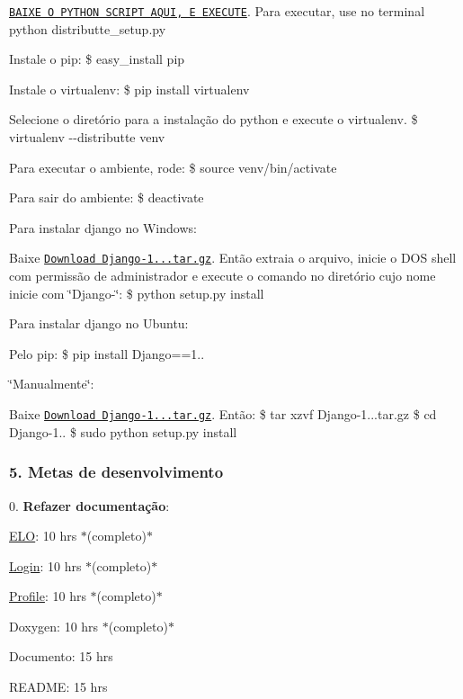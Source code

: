 \href{http://python-distribute.org/distribute_setup.py}{\tt B\-A\-I\-X\-E O P\-Y\-T\-H\-O\-N S\-C\-R\-I\-P\-T A\-Q\-U\-I, E E\-X\-E\-C\-U\-T\-E}. Para executar, use no terminal {\ttfamily python distributte\-\_\-setup.\-py}
\begin{DoxyItemize}
\item Instale o pip\-: {\ttfamily \$ easy\-\_\-install pip}
\item Instale o virtualenv\-: {\ttfamily \$ pip install virtualenv}
\item Selecione o diretório para a instalação do python e execute o virtualenv. {\ttfamily \$ virtualenv -\/-\/distributte venv}
\item Para executar o ambiente, rode\-: {\ttfamily \$ source venv/bin/activate}
\item Para sair do ambiente\-: {\ttfamily \$ deactivate}
\end{DoxyItemize}

Para instalar django no Windows\-:
\begin{DoxyItemize}
\item Baixe \href{https://www.djangoproject.com/download/1.6.2/tarball/}{\tt Download Django-\/1...\-tar.\-gz}. Então extraia o arquivo, inicie o D\-O\-S shell com permissão de administrador e execute o comando no diretório cujo nome inicie com \char`\"{}\-Django-\/\char`\"{}\-: {\ttfamily \$ python setup.\-py install}
\end{DoxyItemize}

Para instalar django no Ubuntu\-:
\begin{DoxyItemize}
\item Pelo pip\-: {\ttfamily \$ pip install Django==1..}
\item \char`\"{}\-Manualmente\char`\"{}\-:
\begin{DoxyItemize}
\item Baixe \href{https://www.djangoproject.com/download/1.6.2/tarball/}{\tt Download Django-\/1...\-tar.\-gz}. Então\-: {\ttfamily \$ tar xzvf Django-\/1...\-tar.\-gz} {\ttfamily \$ cd Django-\/1..} {\ttfamily \$ sudo python setup.\-py install}
\end{DoxyItemize}
\end{DoxyItemize}

\subsubsection*{5. Metas de desenvolvimento}

0. {\bfseries Refazer documentação}\-:
\begin{DoxyItemize}
\item \hyperlink{namespaceELO}{E\-L\-O}\-: 10 hrs $\ast$(completo)$\ast$
\item \hyperlink{namespaceLogin}{Login}\-: 10 hrs $\ast$(completo)$\ast$
\item \hyperlink{namespaceProfile}{Profile}\-: 10 hrs $\ast$(completo)$\ast$
\item Doxygen\-: 10 hrs $\ast$(completo)$\ast$
\item Documento\-: 15 hrs
\item R\-E\-A\-D\-M\-E\-: 15 hrs
\end{DoxyItemize}

